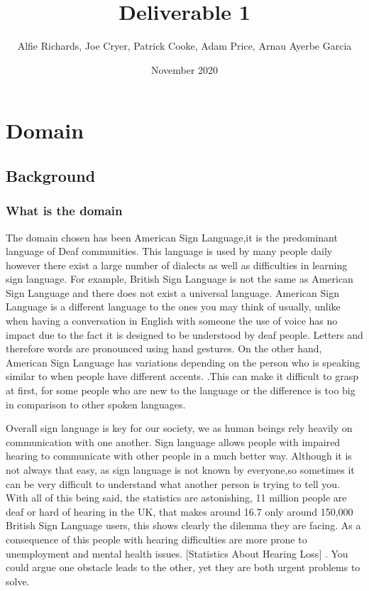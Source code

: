 \documentclass[10pt]{article}
\title{Deliverable 1}
\author{Alfie Richards, Joe Cryer, Patrick Cooke, Adam Price, Arnau Ayerbe Garcia}
\begin{document}
\date{November 2020}
\maketitle
\tableofcontents

\newpage

\section{Domain}
\subsection{Background}
\subsubsection{What is the domain}

The domain chosen has been American Sign Language,it is the predominant language of Deaf 
communities. This language is used by many people daily however there exist a large number of 
dialects as well as difficulties in learning sign language. For example, British Sign Language is 
not the same as American Sign Language and there does not exist a universal language. American Sign 
Language is a different language to the ones you may think of usually, unlike when having a 
conversation in English with someone the use of voice has no impact due to the fact it is designed 
to be understood by deaf people. Letters and therefore words are pronounced using hand gestures. On 
the other hand, American Sign Language has variations depending on the person who is speaking 
similar to when people have different accents. 
\cite{national_institute_of_deafness_and_other_communication_disorders_2020} .This can make it 
difficult to grasp at first, for some people who are new to the language or the difference is too 
big in comparison to other spoken languages. 

Overall sign language is key for our society, we as human beings rely heavily on communication with 
one another. Sign language allows people with impaired hearing to communicate with other people in a 
much better way. Although it is not always that easy, as sign language is not known by everyone,so 
sometimes it can be very difficult to understand what another person is trying to tell you. With all 
of this being said, the statistics are astonishing, 11 million people are deaf or hard of hearing in 
the UK, that makes around 16.7%
only around 150,000 British Sign Language users, this shows clearly the dilemma they are facing. As 
a consequence of this people with hearing difficulties are more prone to unemployment and mental 
health issues. [Statistics About Hearing Loss] . You could argue one obstacle leads to the other, 
yet they are both urgent problems to solve.
\end{document}
